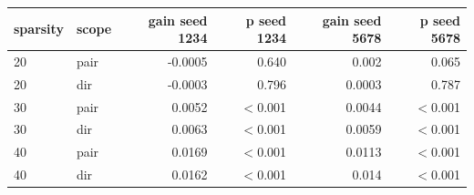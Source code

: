 \begin{tabular}{llrrrr}
\toprule
sparsity & scope & gain seed 1234 & p seed 1234 & gain seed 5678 & p seed 5678 \\
\midrule
20 & pair & -0.0005 & 0.640 & 0.002 & 0.065 \\
20 & dir & -0.0003 & 0.796 & 0.0003 & 0.787 \\
30 & pair & 0.0052 & $<$0.001 & 0.0044 & $<$0.001 \\
30 & dir & 0.0063 & $<$0.001 & 0.0059 & $<$0.001 \\
40 & pair & 0.0169 & $<$0.001 & 0.0113 & $<$0.001 \\
40 & dir & 0.0162 & $<$0.001 & 0.014 & $<$0.001 \\
\bottomrule
\end{tabular}
